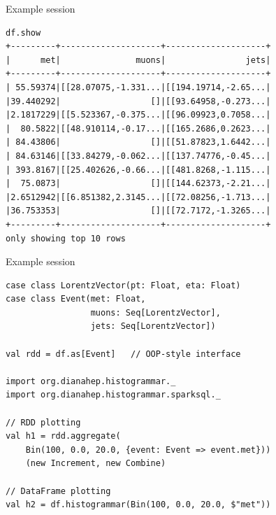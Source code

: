 \documentclass{beamer}
\begin{document}
\begin{frame}[fragile]{Example session}
\small
\begin{verbatim}
df.show
+---------+--------------------+--------------------+
|      met|               muons|                jets|
+---------+--------------------+--------------------+
| 55.59374|[[28.07075,-1.331...|[[194.19714,-2.65...|
|39.440292|                  []|[[93.64958,-0.273...|
|2.1817229|[[5.523367,-0.375...|[[96.09923,0.7058...|
|  80.5822|[[48.910114,-0.17...|[[165.2686,0.2623...|
| 84.43806|                  []|[[51.87823,1.6442...|
| 84.63146|[[33.84279,-0.062...|[[137.74776,-0.45...|
| 393.8167|[[25.402626,-0.66...|[[481.8268,-1.115...|
|  75.0873|                  []|[[144.62373,-2.21...|
|2.6512942|[[6.851382,2.3145...|[[72.08256,-1.713...|
|36.753353|                  []|[[72.7172,-1.3265...|
+---------+--------------------+--------------------+
only showing top 10 rows
\end{verbatim}
\end{frame}

\begin{frame}[fragile]{Example session}
\small
\begin{verbatim}
case class LorentzVector(pt: Float, eta: Float)
case class Event(met: Float,
                 muons: Seq[LorentzVector],
                 jets: Seq[LorentzVector])

val rdd = df.as[Event]   // OOP-style interface

import org.dianahep.histogrammar._
import org.dianahep.histogrammar.sparksql._

// RDD plotting
val h1 = rdd.aggregate(
    Bin(100, 0.0, 20.0, {event: Event => event.met}))
    (new Increment, new Combine)

// DataFrame plotting
val h2 = df.histogrammar(Bin(100, 0.0, 20.0, $"met"))
\end{verbatim}
\end{frame}

\begin{frame}{}

\end{frame}

\end{document}

